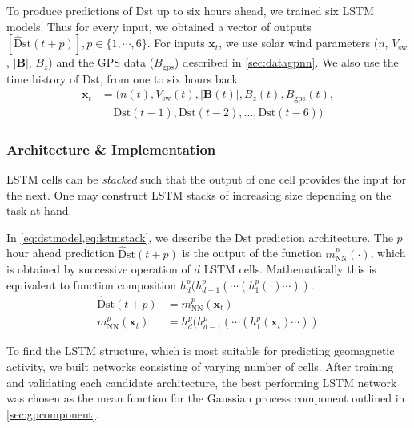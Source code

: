 To produce predictions of Dst up to six hours ahead, we trained six LSTM models. Thus for every 
input, we obtained a vector of outputs 
$[\mathrm{\hat{D}st}\left(t + p\right)], p\in \{ 1, \cdots, 6 \}$.
%
For inputs $\mathbf{x}_t$, we use solar wind parameters 
($n$, $V_{\text{sw}}$, $|\mathbf{B}|$, $B_{z}$) and the GPS data ($B_{\text{gps}}$) described in 
\cref{sec:datagpnn}. We also use the time history of Dst, from one to six hours back.
%
\begin{equation}\label{eq:lstminputs}
	\begin{aligned}
		\mathbf{x}_t &= (n \left( t \right) , V_{\text{sw}}\left( t \right), 
		|\mathbf{B}\left( t \right)|, B_{z}\left( t \right) , B_{\text{gps}} \left( t \right),\\ 
		& \ \  \ \  \ \mathrm{Dst} \left( t-1 \right), \mathrm{Dst} \left( t-2 \right) , \ldots , 
		\mathrm{Dst} \left( t-6 \right) )
	\end{aligned}
\end{equation}

\subsubsection*{Architecture \& Implementation}

LSTM cells can be \emph{stacked} such that the output of one cell provides the input for the next. 
One may construct LSTM stacks of increasing size depending on the task at hand.  

In \cref{eq:dstmodel,eq:lstmstack}, we describe the Dst prediction architecture. The $p$ hour 
ahead prediction $\mathrm{\hat{D}st} \left(t + p \right)$ is the output of the function 
$m^{p}_{\text{NN}}(\cdot)$, which is obtained by successive operation of $d$ LSTM cells. 
Mathematically this is equivalent to function composition 
$h^{p}_{d} ( h^{p}_{d-1}( \cdots (h^{p}_{1}(\cdot)\cdots))$.
%
\begin{align}
	\mathrm{\hat{D}st} \left(t + p \right) &= 
	m^{p}_{\text{NN}} (\mathbf{x}_t) \label{eq:dstmodel}\\
	m^{p}_{\text{NN}} (\mathbf{x}_t) &= 
	h^{p}_{d} ( h^{p}_{d-1}( \cdots (h^{p}_{1}(\mathbf{x}_t)\cdots)) \label{eq:lstmstack}
\end{align}

To find the LSTM structure, which is most suitable for predicting geomagnetic activity, we 
built networks consisting of varying number of cells. After training and validating each candidate 
architecture, the best performing LSTM network was chosen as the mean function for the Gaussian 
process component outlined in \cref{sec:gpcomponent}.

